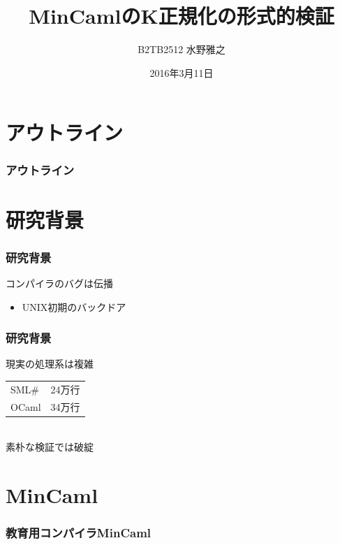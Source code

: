 \documentclass[dvipdfmx,cjk,xcolor=dvipsnames,envcountsect,notheorems,12pt]{beamer}
\title{MinCamlのK正規化の形式的検証}
\author{B2TB2512 水野雅之}
\institute[東北大学　住井・松田研]{工学部　電気情報物理工学科\\住井・松田研究室}%
\date{2016年3月11日}
\theoremstyle{definition}
\begin{document}
\frame[plain]{\titlepage}%

\section*{アウトライン}

\begin{frame}
  \frametitle{アウトライン}
  \tableofcontents[sectionstyle=show,subsectionstyle=hide]
\end{frame}

\section{研究背景}

\begin{frame}
	\frametitle{研究背景}
	\Huge コンパイラのバグは伝播 \\
	\begin{itemize}
		\item UNIX初期のバックドア
	\end{itemize}

\end{frame}

\begin{frame}
	\frametitle{研究背景}
	\Huge 現実の処理系は複雑
	\begin{tabular}{ll}
		SML\# & 24万行 \\
		OCaml & 34万行 
	\end{tabular}\\
	素朴な検証では破綻
\end{frame}

\section{MinCaml}

\begin{frame}
	\frametitle{教育用コンパイラMinCaml}
	\Huge 
\end{frame}
\end{document}
